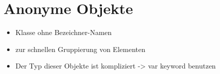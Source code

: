 \section{Anonyme Objekte}

\begin{itemize}
\item Klasse ohne Bezeichner-Namen
\item zur schnellen Gruppierung von Elementen 
\item Der Typ dieser Objekte ist kompliziert -{\textgreater} var keyword benutzen
\end{itemize}